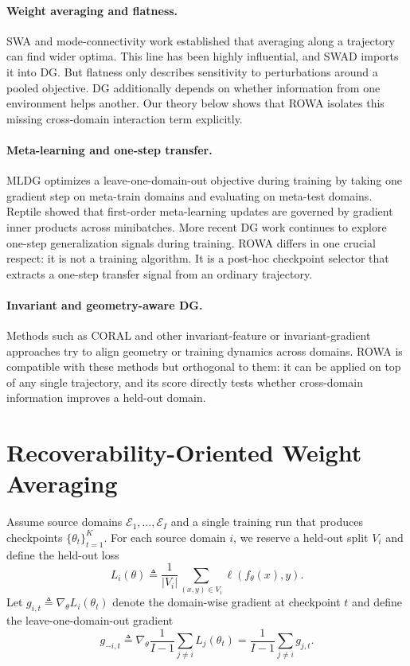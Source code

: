 \documentclass{article}
\newcommand{\rowa}{\textup{\textsc{ROWA}}}
\newcommand{\swad}{\textup{\textsc{SWAD}}}
\begin{document}
\paragraph{Weight averaging and flatness.}
SWA \citep{izmailov2018swa} and mode-connectivity work \citep{garipov2018fge} established that averaging along a trajectory can find wider optima. This line has been highly influential, and \swad{} imports it into DG. But flatness only describes sensitivity to perturbations around a pooled objective. DG additionally depends on whether information from one environment helps another. Our theory below shows that \rowa{} isolates this missing cross-domain interaction term explicitly.

\paragraph{Meta-learning and one-step transfer.}
MLDG \citep{li2018mldg} optimizes a leave-one-domain-out objective during training by taking one gradient step on meta-train domains and evaluating on meta-test domains. Reptile \citep{nichol2018reptile} showed that first-order meta-learning updates are governed by gradient inner products across minibatches. More recent DG work continues to explore one-step generalization signals during training. \rowa{} differs in one crucial respect: it is not a training algorithm. It is a post-hoc checkpoint selector that extracts a one-step transfer signal from an ordinary trajectory.

\paragraph{Invariant and geometry-aware DG.}
Methods such as CORAL \citep{sun2016coral} and other invariant-feature or invariant-gradient approaches try to align geometry or training dynamics across domains. \rowa{} is compatible with these methods but orthogonal to them: it can be applied on top of any single trajectory, and its score directly tests whether cross-domain information improves a held-out domain.

\section{Recoverability-Oriented Weight Averaging}
\label{sec:method}

Assume source domains $\mathcal{E}_{1},\dots,\mathcal{E}_{I}$ and a single training run that produces checkpoints $\{\theta_t\}_{t=1}^{K}$. For each source domain $i$, we reserve a held-out split $V_i$ and define the held-out loss
\begin{equation}
    L_i(\theta) \triangleq \frac{1}{|V_i|}\sum_{(x,y)\in V_i} \ell(f_\theta(x), y).
\end{equation}
Let $g_{i,t} \triangleq \nabla_\theta L_i(\theta_t)$ denote the domain-wise gradient at checkpoint $t$ and define the leave-one-domain-out gradient
\begin{equation}
    g_{-i,t} \triangleq \nabla_\theta \frac{1}{I-1}\sum_{j\neq i} L_j(\theta_t)
    = \frac{1}{I-1}\sum_{j\neq i} g_{j,t}.
\end{equation}
\end{document}
